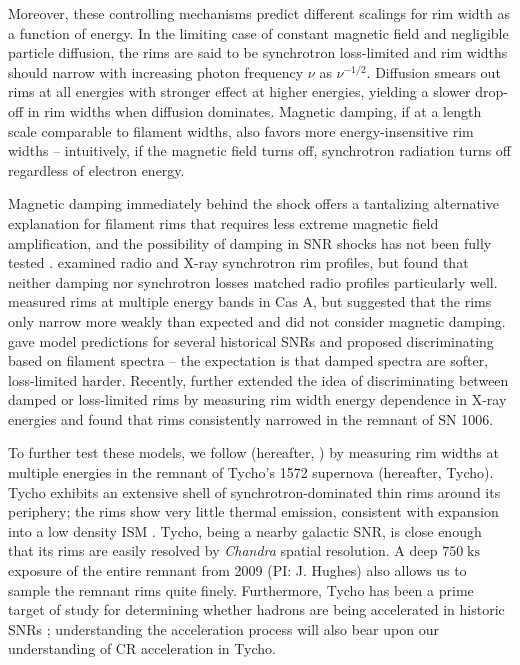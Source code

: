 \documentclass[iop, apj, numberedappendix]{emulateapj}
\newcommand*{\mt}{\mathrm}
\newcommand*{\unit}[1]{\;\mt{#1}}  %
\begin{document}
Moreover, these controlling mechanisms predict different scalings for rim width
as a function of energy.  In the limiting case of constant magnetic field and
negligible particle diffusion, the rims are said to be synchrotron loss-limited
and rim widths should narrow with increasing photon frequency $\nu$ as
$\nu^{-1/2}$. Diffusion smears out rims at all energies with stronger effect at
higher energies, yielding a slower drop-off in rim widths when diffusion
dominates.  Magnetic damping, if at a length scale comparable to filament
widths, also favors more energy-insensitive rim widths -- intuitively, if the
magnetic field turns off, synchrotron radiation turns off regardless of
electron energy.

Magnetic damping immediately behind the shock offers a tantalizing alternative
explanation for filament rims that requires less extreme magnetic field
amplification, and the possibility of damping in SNR shocks has not been fully
tested \citep{pohl2005, marcowith2010}.  \citet{cassam-chenai2007} examined
radio and X-ray synchrotron rim profiles, but found that neither damping nor
synchrotron losses matched radio profiles particularly well.  \citet{araya2010}
measured rims at multiple energy bands in Cas A, but suggested that the rims
only narrow more weakly than expected and did not consider magnetic damping.
\citet{rettig2012} gave model predictions for several historical SNRs and
proposed discriminating based on filament spectra -- the expectation is that
damped spectra are softer, loss-limited harder.  Recently, \citet{ressler2014}
further extended the idea of discriminating between damped or loss-limited
rims by measuring rim width energy dependence in X-ray energies and found that
rims consistently narrowed in the remnant of SN 1006.

To further test these models, we follow \citet{ressler2014} (hereafter,
) by measuring rim widths at multiple energies in the
remnant of Tycho's 1572 supernova (hereafter, Tycho).  Tycho exhibits an
extensive shell of synchrotron-dominated thin rims around its periphery; the
rims show very little thermal emission, consistent with expansion into a low
density ISM \citep{williams2013}.  Tycho, being a nearby galactic SNR, is close
enough that its rims are easily resolved by \textit{Chandra} spatial
resolution. A deep $750 \unit{ks}$ exposure of the entire remnant from 2009
(PI: J. Hughes) also allows us to sample the remnant rims quite finely.
Furthermore, Tycho has been a prime target of study for determining whether
hadrons are being accelerated in historic SNRs \citep[and references
therein]{morlino2012}; understanding the acceleration process will also bear
upon our understanding of CR acceleration in Tycho.
\end{document}
